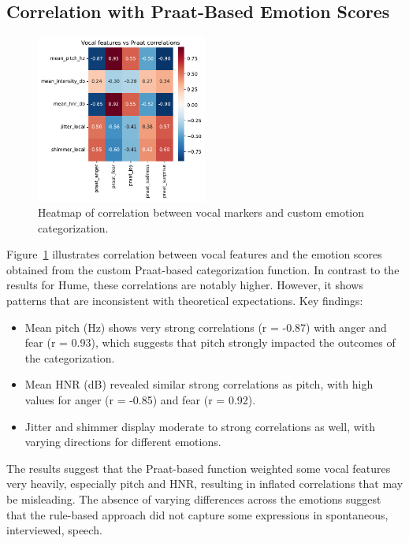 \subsection{Correlation with Praat-Based Emotion Scores}

\begin{figure}[H]
    \centering
    \includegraphics[width=0.5\textwidth]{png/results/rq1/vocal_features_vs_praat_correlations.pdf}
    \caption{Heatmap of correlation between vocal markers and custom emotion categorization.}
    \label{fig:heatmap-voc-praat}
\end{figure}
Figure~\ref{fig:heatmap-voc-praat} illustrates correlation between vocal features and the emotion scores obtained from the custom Praat-based categorization function. In contrast to the results for Hume, these correlations are notably higher. However, it shows patterns that are inconsistent with theoretical expectations. 
\medskip
Key findings: 
\begin{itemize}
    \item Mean pitch (Hz) shows very strong correlations (r = -0.87) with anger and fear (r = 0.93), which suggests that pitch strongly impacted the outcomes of the categorization. 
    \item Mean HNR (dB) revealed similar strong correlations as pitch, with high values for anger (r = -0.85) and fear (r = 0.92). 
    \item Jitter and shimmer display moderate to strong correlations as well, with varying directions for different emotions. 
\end{itemize}
The results suggest that the Praat-based function weighted some vocal features very heavily, especially pitch and HNR, resulting in inflated correlations that may be misleading. The absence of varying differences across the emotions suggest that the rule-based approach did not capture some expressions in spontaneous, interviewed, speech. 

